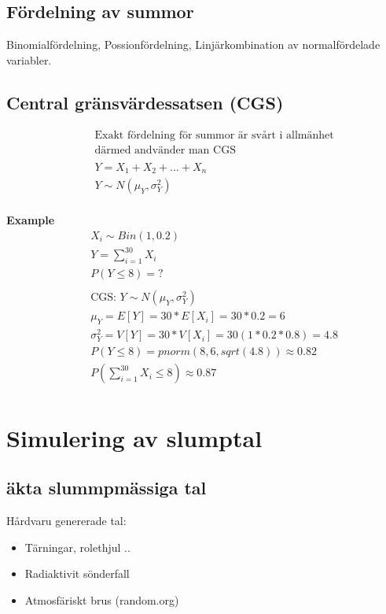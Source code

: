 \subsection{Fördelning av summor}
Binomialfördelning, Possionfördelning, Linjärkombination av normalfördelade variabler.

\subsection{Central gränsvärdessatsen (CGS)}
\begin{align*}
  &\quad  \text{Exakt fördelning för summor är svårt i allmänhet} \\
  &\quad  \text{därmed andvänder man CGS} \\
  &\quad  \\
  &\quad  Y = X_1+X_2+\ldots+X_n \\
  &\quad  Y \sim N(\mu_Y, \sigma_Y^2) \\
\end{align*}

\textbf{Example}
\begin{align*}
  &\quad  X_i \sim Bin(1,0.2) \\
  &\quad  Y=\sum_{i=1}^{30} X_i \\
  &\quad  P(Y\leq8)=? \\
  &\quad  \\
  &\quad  \text{CGS: } Y\sim{N(\mu_Y, \sigma_Y^2)} \\
  &\quad  \mu_Y=E[Y]=30*E[X_i]=30*0.2=6 \\
  &\quad  \sigma_Y^2=V[Y]=30*V[X_i]=30(1*0.2*0.8)=4.8 \\
  &\quad  P(Y\leq8)=pnorm(8, 6, sqrt(4.8))\approx 0.82 \\
  &\quad  P(\sum_{i=1}^{30} X_i\leq8)\approx 0.87 \\
\end{align*}

\section{Simulering av slumptal}
\subsection{äkta slummpmässiga tal}
Hårdvaru genererade tal:
 \begin{itemize}
  \item Tärningar, rolethjul ..
  \item Radiaktivit sönderfall
  \item Atmosfäriskt brus (random.org)
\end{itemize}

